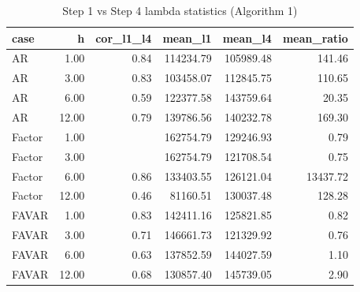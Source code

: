 \begin{table}[ht]
\centering
\begin{tabular}{lrrrrr}
  \hline
case & h & cor\_l1\_l4 & mean\_l1 & mean\_l4 & mean\_ratio \\ 
  \hline
AR & 1.00 & 0.84 & 114234.79 & 105989.48 & 141.46 \\ 
  AR & 3.00 & 0.83 & 103458.07 & 112845.75 & 110.65 \\ 
  AR & 6.00 & 0.59 & 122377.58 & 143759.64 & 20.35 \\ 
  AR & 12.00 & 0.79 & 139786.56 & 140232.78 & 169.30 \\ 
  Factor & 1.00 &  & 162754.79 & 129246.93 & 0.79 \\ 
  Factor & 3.00 &  & 162754.79 & 121708.54 & 0.75 \\ 
  Factor & 6.00 & 0.86 & 133403.55 & 126121.04 & 13437.72 \\ 
  Factor & 12.00 & 0.46 & 81160.51 & 130037.48 & 128.28 \\ 
  FAVAR & 1.00 & 0.83 & 142411.16 & 125821.85 & 0.82 \\ 
  FAVAR & 3.00 & 0.71 & 146661.73 & 121329.92 & 0.76 \\ 
  FAVAR & 6.00 & 0.63 & 137852.59 & 144027.59 & 1.10 \\ 
  FAVAR & 12.00 & 0.68 & 130857.40 & 145739.05 & 2.90 \\ 
   \hline
\end{tabular}
\caption{Step 1 vs Step 4 lambda statistics (Algorithm 1)} 
\label{tab:lambdas_stats}
\end{table}
